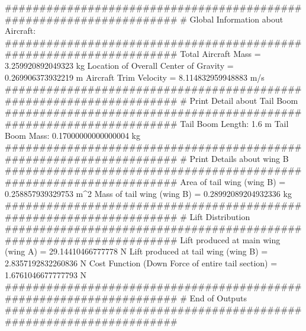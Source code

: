 ####################################################################
# Global Information about Aircraft:
####################################################################
Total Aircraft Mass = 3.259920892049323 kg
Location of Overall Center of Gravity = 0.269906373932219 m
Aircraft Trim Velocity = 8.114832959948883 m/s
####################################################################
# Print Detail about Tail Boom
####################################################################
Tail Boom Length: 1.6 m
Tail Boom Mass: 0.17000000000000004 kg
####################################################################
# Print Details about wing B
####################################################################
Area of tail wing (wing B) = 0.258857939329753 m^2
Mass of tail wing (wing B) = 0.28992089204932336 kg
####################################################################
# Lift Distribution
####################################################################
Lift produced at main wing (wing A) = 29.14410466777778 N
Lift produced at tail wing (wing B) = 2.8357192832260836 N
Cost Function (Down Force of entire tail section) = 1.6761046677777793 N
####################################################################
# End of Outputs
####################################################################
